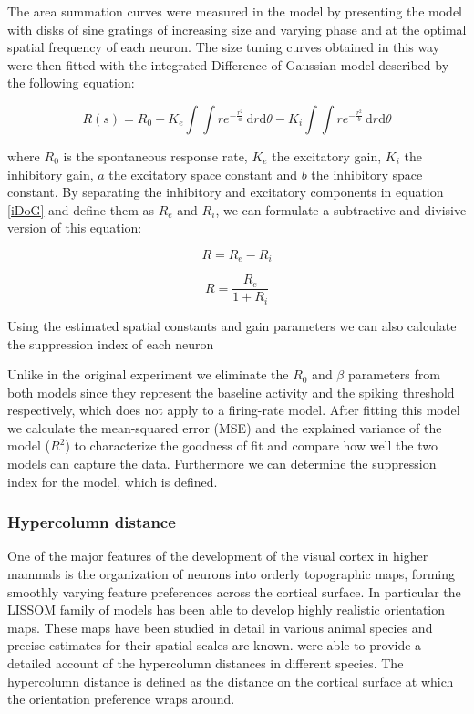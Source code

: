 The area summation curves were measured in the model by presenting the
model with disks of sine gratings of increasing size and varying phase
and at the optimal spatial frequency of each neuron. The size tuning
curves obtained in this way were then fitted with the integrated
Difference of Gaussian model described by the following equation:

\begin{equation}
R(s) = R_0 + K_e \int \int re^{-\frac{r^2}{a}} \,
\mathrm{d}r\mathrm{d}\theta - K_i \int\int re^{-\frac{r^2}{b}} \,
\mathrm{d}r\mathrm{d}\theta
\label{iDoG}
\end{equation}

\noindent where $R_0$ is the spontaneous response rate, $K_e$ the
excitatory gain, $K_i$ the inhibitory gain, $a$ the excitatory space
constant and $b$ the inhibitory space constant. By separating the
inhibitory and excitatory components in equation \ref{iDoG} and define
them as $R_e$ and $R_i$, we can formulate a subtractive and divisive
version of this equation:

\begin{equation}
R = R_e - R_i
\label{DoGSubstractive}
\end{equation}

\begin{equation}
R = \frac{R_e}{1+R_i}
\label{DoGDivisive}
\end{equation}

Using the estimated spatial constants and gain parameters we can also
calculate the suppression index of each neuron

Unlike in the original experiment we eliminate the $R_0$ and $\beta$
parameters from both models since they represent the baseline activity
and the spiking threshold respectively, which does not apply to a
firing-rate model. After fitting this model we calculate the
mean-squared error (MSE) and the explained variance of the model
($R^2$) to characterize the goodness of fit and compare how well the
two models can capture the data. Furthermore we can determine the
suppression index for the model, which is defined.

\subsubsection{Hypercolumn distance}

One of the major features of the development of the visual cortex in
higher mammals is the organization of neurons into orderly topographic
maps, forming smoothly varying feature preferences across the cortical
surface. In particular the LISSOM family of models has been able to
develop highly realistic orientation maps. These maps have been
studied in detail in various animal species and precise estimates for
their spatial scales are known. \cite{Kaschube2010} were able to
provide a detailed account of the hypercolumn distances in different
species. The hypercolumn distance is defined as the distance on the
cortical surface at which the orientation preference wraps around.

